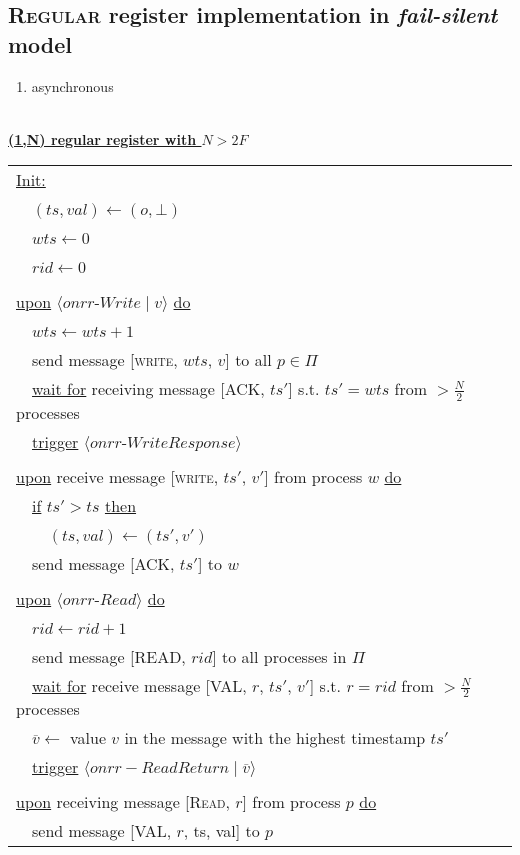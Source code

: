 \documentclass{article}
\begin{document}
\begin{adjustwidth}{2em}{2em}
		\subsection{\textsc{Regular} register implementation in \textit{fail-silent} model}
		\begin{adjustwidth}{2em}{2em}
			\begin{enumerate}[-]
				\item asynchronous
			\end{enumerate} 
			\hfill \\
			\underline{\textbf{(1,N) regular register with $N > 2F$}} \\
			\begin{tabular}{l}
				\underline{Init:} \\
				\ \ $(ts, val) \leftarrow (o, \bot)$ \\
				\ \ $wts \leftarrow 0$ \\
				\ \ $rid \leftarrow 0$ \\
				\\
				\underline{upon} $\langle \textit{onrr-Write} \mid v \rangle$ \underline{do} \\
				\ \ $wts \leftarrow wts+1$ \\
				\ \ send message [\textsc{write}, $wts$, $v$] to all $p \in \Pi$ \\
				\ \ \underline{wait for} receiving message [\textsc{ACK}, $ts'$] s.t. $ts' = wts$ from $> \frac{N}{2}$ processes \\
				\ \ \underline{trigger} $\langle \textit{onrr-WriteResponse} \rangle$ \\
				\\
				\underline{upon} receive message [\textsc{write}, $ts'$, $v'$] from process $w$ \underline{do} \\
				\ \ \underline{if} $ts' > ts$ \underline{then} \\
				\ \ \ \ $(ts, val) \leftarrow (ts',v')$ \\
				\ \ send message [\textsc{ACK}, $ts'$] to $w$ \\
				\\
				\underline{upon} $\langle \textit{onrr-Read} \rangle$ \underline{do} \\
				\ \ $rid \leftarrow rid + 1$ \\
				\ \ send message [\textsc{READ}, $rid$] to all processes in $\Pi$ \\
				\ \ \underline{wait for} receive message [\textsc{VAL}, $r$, $ts'$, $v'$] s.t. $r = rid$ from $> \frac{N}{2}$ processes \\
				\ \ $\overline{v} \leftarrow$ value $v$ in the message with the highest timestamp $ts'$ \\
				\ \ \underline{trigger} $\langle onrr-\textit{ReadReturn} \mid \overline{v} \rangle$ \\
				\\
				\underline{upon} receiving message [\textsc{Read}, $r$] from process $p$ \underline{do} \\
				\ \ send message [\textsc{VAL}, $r$, ts, val] to $p$
			\end{tabular}
		\end{adjustwidth}

\end{adjustwidth}
\end{document}

